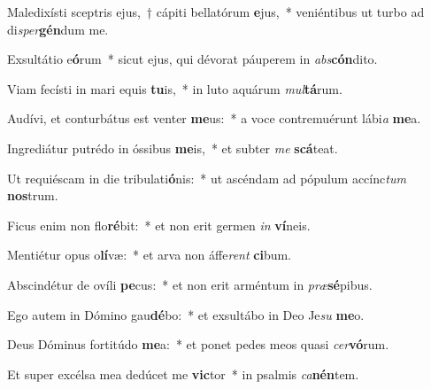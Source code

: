 \item Maledixísti sceptris ejus,~† cápiti bellatórum \textbf{e}jus,~* veniéntibus ut turbo ad di\textit{sper}\textbf{gén}dum me.
\item Exsultátio e\textbf{ó}rum~* sicut ejus, qui dévorat páuperem in \textit{abs}\textbf{cón}dito.
\item Viam fecísti in mari equis \textbf{tu}is,~* in luto aquárum \textit{mul}\textbf{tá}rum.
\item Audívi, et conturbátus est venter \textbf{me}us:~* a voce contremuérunt lábi\textit{a} \textbf{me}a.
\item Ingrediátur putrédo in óssibus \textbf{me}is,~* et subter \textit{me} \textbf{scá}teat.
\item Ut requiéscam in die tribulati\textbf{ó}nis:~* ut ascéndam ad pópulum accínc\textit{tum} \textbf{nos}trum.
\item Ficus enim non flo\textbf{ré}bit:~* et non erit germen \textit{in} \textbf{ví}neis.
\item Mentiétur opus o\textbf{lí}væ:~* et arva non áffe\textit{rent} \textbf{ci}bum.
\item Abscindétur de ovíli \textbf{pe}cus:~* et non erit arméntum in \textit{præ}\textbf{sé}pibus.
\item Ego autem in Dómino gau\textbf{dé}bo:~* et exsultábo in Deo Je\textit{su} \textbf{me}o.
\item Deus Dóminus fortitúdo \textbf{me}a:~* et ponet pedes meos quasi \textit{cer}\textbf{vó}rum.
\item Et super excélsa mea dedúcet me \textbf{vic}tor~* in psalmis \textit{ca}\textbf{nén}tem.
